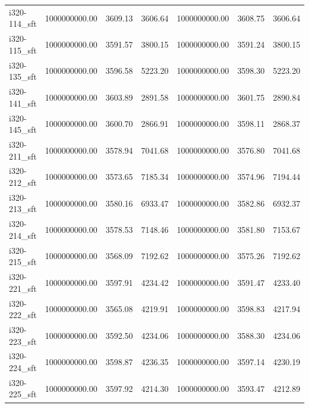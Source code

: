 \begin{tabular}{lrrrrrr}
i320-114\_sft &    1000000000.00 &              3609.13 &        3606.64 &    1000000000.00 &              3608.75 &        3606.64 \\
i320-115\_sft &    1000000000.00 &              3591.57 &        3800.15 &    1000000000.00 &              3591.24 &        3800.15 \\
i320-135\_sft &    1000000000.00 &              3596.58 &        5223.20 &    1000000000.00 &              3598.30 &        5223.20 \\
i320-141\_sft &    1000000000.00 &              3603.89 &        2891.58 &    1000000000.00 &              3601.75 &        2890.84 \\
i320-145\_sft &    1000000000.00 &              3600.70 &        2866.91 &    1000000000.00 &              3598.11 &        2868.37 \\
i320-211\_sft &    1000000000.00 &              3578.94 &        7041.68 &    1000000000.00 &              3576.80 &        7041.68 \\
i320-212\_sft &    1000000000.00 &              3573.65 &        7185.34 &    1000000000.00 &              3574.96 &        7194.44 \\
i320-213\_sft &    1000000000.00 &              3580.16 &        6933.47 &    1000000000.00 &              3582.86 &        6932.37 \\
i320-214\_sft &    1000000000.00 &              3578.53 &        7148.46 &    1000000000.00 &              3581.80 &        7153.67 \\
i320-215\_sft &    1000000000.00 &              3568.09 &        7192.62 &    1000000000.00 &              3575.26 &        7192.62 \\
i320-221\_sft &    1000000000.00 &              3597.91 &        4234.42 &    1000000000.00 &              3591.47 &        4233.40 \\
i320-222\_sft &    1000000000.00 &              3565.08 &        4219.91 &    1000000000.00 &              3598.83 &        4217.94 \\
i320-223\_sft &    1000000000.00 &              3592.50 &        4234.06 &    1000000000.00 &              3588.30 &        4234.06 \\
i320-224\_sft &    1000000000.00 &              3598.87 &        4236.35 &    1000000000.00 &              3597.14 &        4230.19 \\
i320-225\_sft &    1000000000.00 &              3597.92 &        4214.30 &    1000000000.00 &              3593.47 &        4212.89 \\

\end{tabular}
